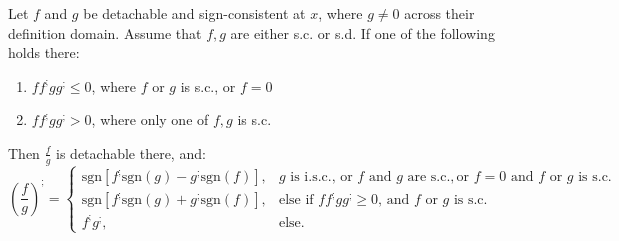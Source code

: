 \documentclass[11pt]{book}
\begin{document}
\begin{theorem}Let $f$ and $g$ be detachable and sign-consistent at $x$, where $g\neq0$ across their definition domain. Assume that $f,g$ are either s.c. or s.d. If one of the following holds there:

\begin{enumerate}
\item $ff^{;}gg^{;}\leq0$, where $f$ or $g$ is s.c., or $f=0$
\item $ff^{;}gg^{;}>0$, where only one of $f,g$ is s.c.
\end{enumerate}

Then $\frac{f}{g}$ is detachable there, and: $$\left(\frac{f}{g}\right)^{;}=\begin{cases}
\text{sgn}\left[f^{;}\text{sgn}\left(g\right)-g^{;}\text{sgn}\left(f\right)\right], & g\text{ is i.s.c., or }f\text{ and }g\text{ are s.c.},\text{or }f=0\text{ and }f\text{ or }g\text{ is s.c.}\\
\text{sgn}\left[f^{;}\text{sgn}\left(g\right)+g^{;}\text{sgn}\left(f\right)\right], & \text{else if }ff^{;}gg^{;}\geq0\text{, and }f\text{ or }g\text{ is s.c.}\\
f^{;}g^{;}, & \text{else.}
\end{cases}$$
\label{quotient_rule}
\end{theorem}
\end{document}
